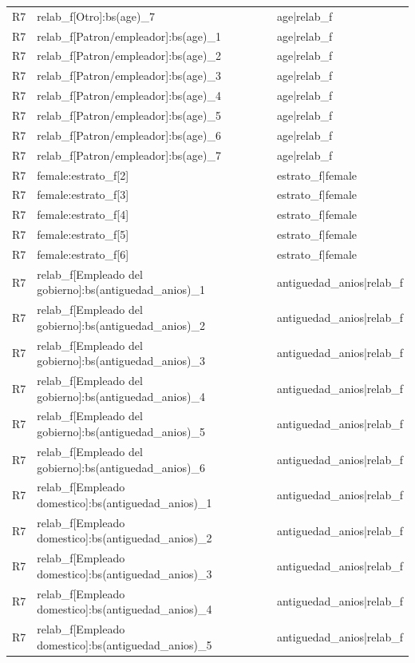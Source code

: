\begin{longtable}{lll}
R7 & relab\_f[Otro]:bs(age)\_7 & age|relab\_f \\
R7 & relab\_f[Patron/empleador]:bs(age)\_1 & age|relab\_f \\
R7 & relab\_f[Patron/empleador]:bs(age)\_2 & age|relab\_f \\
R7 & relab\_f[Patron/empleador]:bs(age)\_3 & age|relab\_f \\
R7 & relab\_f[Patron/empleador]:bs(age)\_4 & age|relab\_f \\
R7 & relab\_f[Patron/empleador]:bs(age)\_5 & age|relab\_f \\
R7 & relab\_f[Patron/empleador]:bs(age)\_6 & age|relab\_f \\
R7 & relab\_f[Patron/empleador]:bs(age)\_7 & age|relab\_f \\
R7 & female:estrato\_f[2] & estrato\_f|female \\
R7 & female:estrato\_f[3] & estrato\_f|female \\
R7 & female:estrato\_f[4] & estrato\_f|female \\
R7 & female:estrato\_f[5] & estrato\_f|female \\
R7 & female:estrato\_f[6] & estrato\_f|female \\
R7 & relab\_f[Empleado del gobierno]:bs(antiguedad\_anios)\_1 & antiguedad\_anios|relab\_f \\
R7 & relab\_f[Empleado del gobierno]:bs(antiguedad\_anios)\_2 & antiguedad\_anios|relab\_f \\
R7 & relab\_f[Empleado del gobierno]:bs(antiguedad\_anios)\_3 & antiguedad\_anios|relab\_f \\
R7 & relab\_f[Empleado del gobierno]:bs(antiguedad\_anios)\_4 & antiguedad\_anios|relab\_f \\
R7 & relab\_f[Empleado del gobierno]:bs(antiguedad\_anios)\_5 & antiguedad\_anios|relab\_f \\
R7 & relab\_f[Empleado del gobierno]:bs(antiguedad\_anios)\_6 & antiguedad\_anios|relab\_f \\
R7 & relab\_f[Empleado domestico]:bs(antiguedad\_anios)\_1 & antiguedad\_anios|relab\_f \\
R7 & relab\_f[Empleado domestico]:bs(antiguedad\_anios)\_2 & antiguedad\_anios|relab\_f \\
R7 & relab\_f[Empleado domestico]:bs(antiguedad\_anios)\_3 & antiguedad\_anios|relab\_f \\
R7 & relab\_f[Empleado domestico]:bs(antiguedad\_anios)\_4 & antiguedad\_anios|relab\_f \\
R7 & relab\_f[Empleado domestico]:bs(antiguedad\_anios)\_5 & antiguedad\_anios|relab\_f \\

\end{longtable}
